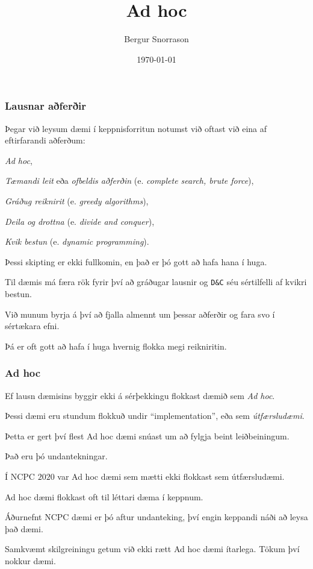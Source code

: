 \title{Ad hoc}
\author{Bergur Snorrason}
\date{\today}



\frame{\titlepage}

{
	\frametitle{Lausnar aðferðir}
	{
		\item<1-> Þegar við leysum dæmi í keppnisforritun notumst við oftast við eina af eftirfarandi aðferðum:
		{
			\item<2-> \emph{Ad hoc},
			\item<3-> \emph{Tæmandi leit} eða \emph{ofbeldis aðferðin} (e. \emph{complete search, brute force}),
			\item<4-> \emph{Gráðug reiknirit} (e. \emph{greedy algorithms}),
			\item<5-> \emph{Deila og drottna} (e. \emph{divide and conquer}),
			\item<6-> \emph{Kvik bestun} (e. \emph{dynamic programming}).
		}
		\item<7-> Þessi skipting er ekki fullkomin, en það er þó gott að hafa hana í huga.
		\item<8-> Til dæmis má færa rök fyrir því að gráðugar lausnir og \texttt{D\&C} séu sértilfelli af kvikri bestun.
		\item<9-> Við munum byrja á því að fjalla almennt um þessar aðferðir og fara svo í sértækara efni.
		\item<10-> Þá er oft gott að hafa í huga hvernig flokka megi reikniritin.
	}
}

{
	\frametitle{Ad hoc}
	{
		\item<1-> Ef lausn dæmisins byggir ekki á sérþekkingu flokkast dæmið sem \emph{Ad hoc}.
		\item<2-> Þessi dæmi eru stundum flokkuð undir ``implementation'', eða sem \emph{útfærsludæmi}.
		\item<3-> Þetta er gert því flest Ad hoc dæmi snúast um að fylgja beint leiðbeiningum.
		\item<4-> Það eru þó undantekningar.
		\item<5-> Í NCPC $2020$ var Ad hoc dæmi sem mætti ekki flokkast sem útfærsludæmi.
		\item<6-> Ad hoc dæmi flokkast oft til léttari dæma í keppnum.
		\item<7-> Áðurnefnt NCPC dæmi er þó aftur undanteking, því engin keppandi náði að leysa það dæmi.
		\item<8-> Samkvæmt skilgreiningu getum við ekki rætt Ad hoc dæmi ítarlega. Tökum því nokkur dæmi.
	}
}

